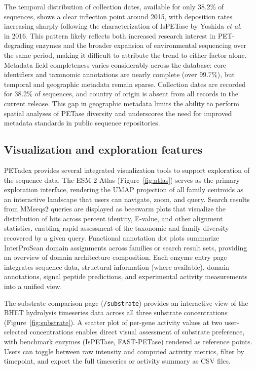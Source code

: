 \documentclass[unnumsec,webpdf,modern,large]{oup-authoring-template}
\begin{document}
The temporal distribution of collection dates, available for only 38.2\% of sequences, shows a clear inflection point around 2015, with deposition rates increasing sharply following the characterization of IsPETase by Yoshida \textit{et al.}\ \citep{yoshida_bacterium_2016} in 2016. This pattern likely reflects both increased research interest in PET-degrading enzymes and the broader expansion of environmental sequencing over the same period, making it difficult to attribute the trend to either factor alone. Metadata field completeness varies considerably across the database: core identifiers and taxonomic annotations are nearly complete (over 99.7\%), but temporal and geographic metadata remain sparse. Collection dates are recorded for 38.2\% of sequences, and country of origin is absent from all records in the current release. This gap in geographic metadata limits the ability to perform spatial analyses of PETase diversity and underscores the need for improved metadata standards in public sequence repositories.

\subsection{Visualization and exploration features}

PETadex provides several integrated visualization tools to support exploration of the sequence data. The ESM-2 Atlas (Figure~\ref{fig:atlas}) serves as the primary exploration interface, rendering the UMAP projection of all family centroids as an interactive landscape that users can navigate, zoom, and query. Search results from MMseqs2 queries are displayed as beeswarm plots that visualize the distribution of hits across percent identity, E-value, and other alignment statistics, enabling rapid assessment of the taxonomic and family diversity recovered by a given query. Functional annotation dot plots summarize InterProScan domain assignments across families or search result sets, providing an overview of domain architecture composition. Each enzyme entry page integrates sequence data, structural information (where available), domain annotations, signal peptide predictions, and experimental activity measurements into a unified view.

The substrate comparison page (\texttt{/substrate}) provides an interactive view of the BHET hydrolysis timeseries data across all three substrate concentrations (Figure~\ref{fig:substrate}). A scatter plot of per-gene activity values at two user-selected concentrations enables direct visual assessment of substrate preference, with benchmark enzymes (IsPETase, FAST-PETase) rendered as reference points. Users can toggle between raw intensity and computed activity metrics, filter by timepoint, and export the full timeseries or activity summary as CSV files.
\end{document}
